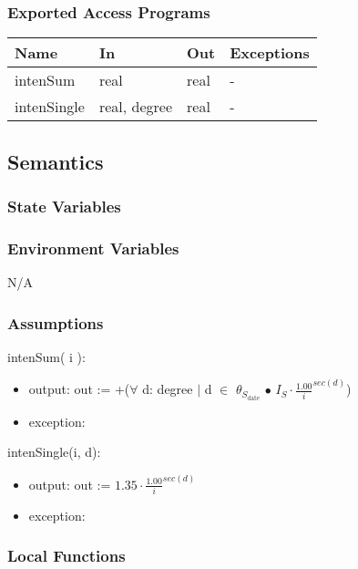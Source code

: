 \documentclass[12pt, titlepage]{article}
\begin{document}
\subsubsection{Exported Access Programs}

\begin{center}
\begin{tabular}{p{2cm} p{4cm} p{4cm} p{2cm}}
\hline
\textbf{Name} & \textbf{In} & \textbf{Out} & \textbf{Exceptions} \\
\hline 
intenSum & real & real & - \\
intenSingle & real, degree & real & - \\

\hline
\end{tabular}
\end{center}


\subsection{Semantics}

\subsubsection{State Variables}


\subsubsection{Environment Variables}

N/A

\subsubsection{Assumptions}


\noindent intenSum( i ):
\begin{itemize}
\item output: out := +($\forall$ d: degree $|$ d $\in$ $\theta_{S_{\text{date}}}$ $\bullet$ $I_{S} \cdot \frac{1.00}{i}^{sec(d)} $)
\item exception: 
\end{itemize}

\noindent intenSingle(i, d):
\begin{itemize}
\item output: out := $1.35 \cdot \frac{1.00}{i}^
{sec(d)} $
\item exception: 
\end{itemize}

\subsubsection{Local Functions}
\end{document}

